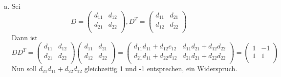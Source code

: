 \documentclass{scrreprt}
\begin{document}
\begin{enumerate}[(a)]
\begin{enumerate}[(a)]
  \item Sei
    \[
      D = \begin{pmatrix}
        d_{11} & d_{12} \\
        d_{21} & d_{22} \\
      \end{pmatrix},
      D^T = \begin{pmatrix}
        d_{11} & d_{21} \\
        d_{12} & d_{22} \\
      \end{pmatrix}
    \]
    Dann ist
    \[
      DD^T = \begin{pmatrix}
        d_{11} & d_{12} \\
        d_{21} & d_{22} \\
      \end{pmatrix}\begin{pmatrix}
        d_{11} & d_{21} \\
        d_{12} & d_{22} \\
      \end{pmatrix} = \begin{pmatrix}
        d_{11}d_{11} + d_{12}c_{12} & d_{11}d_{21} + d_{12}d_{22} \\
        d_{21}d_{11} + d_{22}d_{12} & d_{21}d_{21} + d_{22}d_{22} \\
      \end{pmatrix} = \begin{pmatrix}
        1 & -1 \\
        1 & 1  \\
      \end{pmatrix}
    \]
    Nun soll $d_{21}d_{11} + d_{22}d_{12}$ gleichzeitig 1 und -1 entsprechen, ein
    Widerspruch.
  \end{enumerate}
\end{enumerate}
\end{document}
